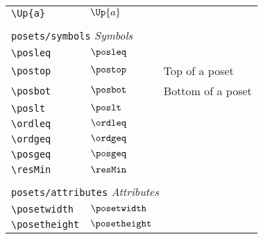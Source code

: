 \begin{longtable}{lll}
  {\color[rgb]{0.5,0.5,0.5}\texttt{\textbackslash Up\{a\}}}                                                 & $\Up{a}$                   &                                                         \\
  &                            &                                                         \\
  \multicolumn{3}{l}{{\color[rgb]{0.5,0.5,0.5}\texttt{posets/symbols}} \emph{Symbols}}
  \\
  \hline
  {\color[rgb]{0.5,0.5,0.5}\texttt{\textbackslash posleq}}                                                  & $\posleq$                  & \\
  {\color[rgb]{0.5,0.5,0.5}\texttt{\textbackslash postop}}                                                  & $\postop$                  & Top of a poset\\
  {\color[rgb]{0.5,0.5,0.5}\texttt{\textbackslash posbot}}                                                  & $\posbot$                  & Bottom of a poset\\
  {\color[rgb]{0.5,0.5,0.5}\texttt{\textbackslash poslt}}                                                   & $\poslt$                   & \\
  {\color[rgb]{0.5,0.5,0.5}\texttt{\textbackslash ordleq}}                                                  & $\ordleq$                  & \\
  {\color[rgb]{0.5,0.5,0.5}\texttt{\textbackslash ordgeq}}                                                  & $\ordgeq$                  & \\
  {\color[rgb]{0.5,0.5,0.5}\texttt{\textbackslash posgeq}}                                                  & $\posgeq$                  & \\
  {\color[rgb]{0.5,0.5,0.5}\texttt{\textbackslash resMin}}                                                  & $\resMin$                  &                                                         \\
  &                            &                                                         \\
  \multicolumn{3}{l}{{\color[rgb]{0.5,0.5,0.5}\texttt{posets/attributes}} \emph{Attributes}}
  \\
  \hline
  {\color[rgb]{0.5,0.5,0.5}\texttt{\textbackslash posetwidth}}                                              & $\posetwidth$              & \\
  {\color[rgb]{0.5,0.5,0.5}\texttt{\textbackslash posetheight}}                                             & $\posetheight$             &                                                         \\

\end{longtable}
